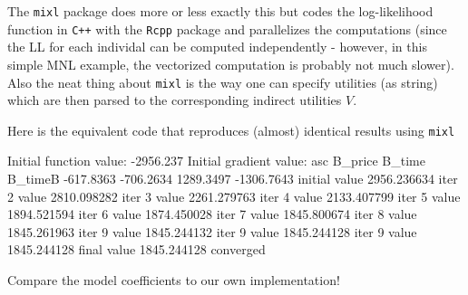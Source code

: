 \documentclass[a4paper]{article}
\begin{document}
The \texttt{mixl} package does more or less exactly this but codes the log-likelihood function in \texttt{C++} with the \texttt{Rcpp} package and parallelizes the computations (since the LL for each individal can be computed independently - however, in this simple MNL example, the vectorized computation is probably not much slower). Also the neat thing about \texttt{mixl} is the way one can specify utilities (as string) which are then parsed to the corresponding indirect utilities $V$.

Here is the equivalent code that reproduces (almost) identical results using \texttt{mixl}

\begin{Schunk}
\begin{Soutput}
Initial function value: -2956.237 
Initial gradient value:
       asc    B_price     B_time    B_timeB 
 -617.8363  -706.2634  1289.3497 -1306.7643 
initial  value 2956.236634 
iter   2 value 2810.098282
iter   3 value 2261.279763
iter   4 value 2133.407799
iter   5 value 1894.521594
iter   6 value 1874.450028
iter   7 value 1845.800674
iter   8 value 1845.261963
iter   9 value 1845.244132
iter   9 value 1845.244128
iter   9 value 1845.244128
final  value 1845.244128 
converged
\end{Soutput}
\end{Schunk}

Compare the model coefficients to our own implementation!
\end{document}
